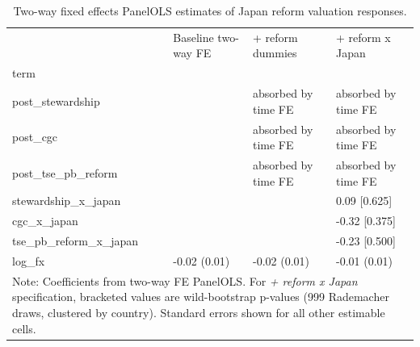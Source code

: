 \begin{table}
\caption{Two-way fixed effects PanelOLS estimates of Japan reform valuation responses.}
\label{tab:panel_ols}
\begin{tabular}{llll}
\toprule
 & Baseline two-way FE & + reform dummies & + reform x Japan \\
term &  &  &  \\
\midrule
post_stewardship &  & absorbed by time FE & absorbed by time FE \\
post_cgc &  & absorbed by time FE & absorbed by time FE \\
post_tse_pb_reform &  & absorbed by time FE & absorbed by time FE \\
stewardship_x_japan &  &  & 0.09 [0.625] \\
cgc_x_japan &  &  & -0.32 [0.375] \\
tse_pb_reform_x_japan &  &  & -0.23 [0.500] \\
log_fx & -0.02 (0.01) & -0.02 (0.01) & -0.01 (0.01) \\
\multicolumn{4}{l}{\footnotesize Note: Coefficients from two-way FE PanelOLS. For \textit{+ reform x Japan} specification, bracketed values are wild-bootstrap p-values (999 Rademacher draws, clustered by country). Standard errors shown for all other estimable cells.} \\
\bottomrule
\end{tabular}
\end{table}

